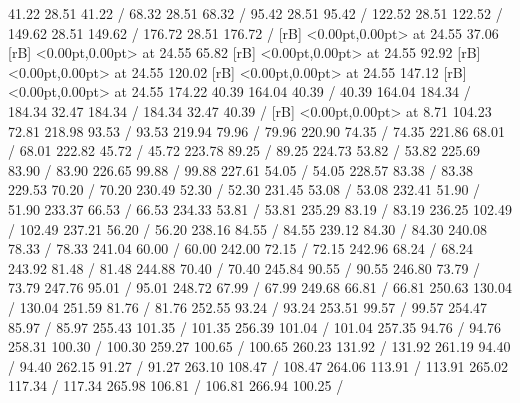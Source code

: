 {\setsolid
{} 41.22 28.51 41.22 /
\setsolid
{} 68.32 28.51 68.32 /
\setsolid
{} 95.42 28.51 95.42 /
\setsolid
{} 122.52 28.51 122.52 /
\setsolid
{} 149.62 28.51 149.62 /
\setsolid
{} 176.72 28.51 176.72 /
 [rB] <0.00pt,0.00pt> at 24.55 37.06
 [rB] <0.00pt,0.00pt> at 24.55 65.82
 [rB] <0.00pt,0.00pt> at 24.55 92.92
 [rB] <0.00pt,0.00pt> at 24.55 120.02
 [rB] <0.00pt,0.00pt> at 24.55 147.12
 [rB] <0.00pt,0.00pt> at 24.55 174.22
\setsolid
{} 40.39 164.04 40.39 /
 40.39 164.04 184.34 /
 184.34 32.47 184.34 /
 184.34 32.47 40.39 /
 [rB] <0.00pt,0.00pt> at 8.71 104.23
\setsolid
{} 72.81 218.98 93.53 /
 93.53 219.94 79.96 /
 79.96 220.90 74.35 /
 74.35 221.86 68.01 /
 68.01 222.82 45.72 /
 45.72 223.78 89.25 /
 89.25 224.73 53.82 /
 53.82 225.69 83.90 /
 83.90 226.65 99.88 /
 99.88 227.61 54.05 /
 54.05 228.57 83.38 /
 83.38 229.53 70.20 /
 70.20 230.49 52.30 /
 52.30 231.45 53.08 /
 53.08 232.41 51.90 /
 51.90 233.37 66.53 /
 66.53 234.33 53.81 /
 53.81 235.29 83.19 /
 83.19 236.25 102.49 /
 102.49 237.21 56.20 /
 56.20 238.16 84.55 /
 84.55 239.12 84.30 /
 84.30 240.08 78.33 /
 78.33 241.04 60.00 /
 60.00 242.00 72.15 /
 72.15 242.96 68.24 /
 68.24 243.92 81.48 /
 81.48 244.88 70.40 /
 70.40 245.84 90.55 /
 90.55 246.80 73.79 /
 73.79 247.76 95.01 /
 95.01 248.72 67.99 /
 67.99 249.68 66.81 /
 66.81 250.63 130.04 /
 130.04 251.59 81.76 /
 81.76 252.55 93.24 /
 93.24 253.51 99.57 /
 99.57 254.47 85.97 /
 85.97 255.43 101.35 /
 101.35 256.39 101.04 /
 101.04 257.35 94.76 /
 94.76 258.31 100.30 /
 100.30 259.27 100.65 /
 100.65 260.23 131.92 /
 131.92 261.19 94.40 /
 94.40 262.15 91.27 /
 91.27 263.10 108.47 /
 108.47 264.06 113.91 /
 113.91 265.02 117.34 /
 117.34 265.98 106.81 /
 106.81 266.94 100.25 /
}
